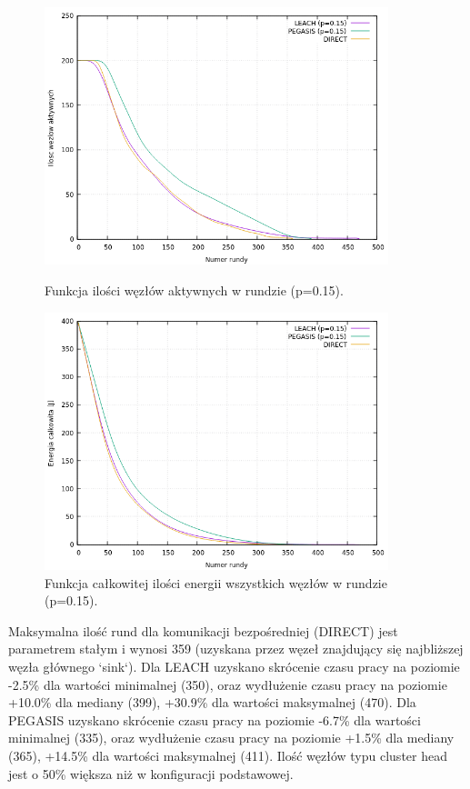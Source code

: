 \documentclass[a4paper,12pt,twoside,openany]{report}
\begin{document}
\begin{figure}[H]
 \centering
 \includegraphics[width=10cm]{images/gnuplot/test_4/nodes_in_round_p015.png}
 \caption{Funkcja ilości węzłów aktywnych w rundzie (p=0.15).}
 \includegraphics[width=10cm]{images/gnuplot/test_4/energy_in_round_p015.png}
 \caption{Funkcja całkowitej ilości energii wszystkich węzłów w rundzie (p=0.15).}
\end{figure}

\par
Maksymalna ilość rund dla komunikacji bezpośredniej (DIRECT) jest parametrem stałym i wynosi 359 (uzyskana przez węzeł znajdujący się najbliższej węzła głównego `sink`).
Dla LEACH uzyskano skrócenie czasu pracy na poziomie -2.5\% dla wartości minimalnej (350), oraz wydłużenie czasu pracy na poziomie +10.0\% dla mediany (399), +30.9\% dla wartości maksymalnej (470).
Dla PEGASIS uzyskano skrócenie czasu pracy na poziomie -6.7\% dla wartości minimalnej (335), oraz wydłużenie czasu pracy na poziomie +1.5\% dla mediany (365), +14.5\% dla wartości maksymalnej (411).
Ilość węzłów typu cluster head jest o 50\% większa niż w konfiguracji podstawowej.
\end{document}
